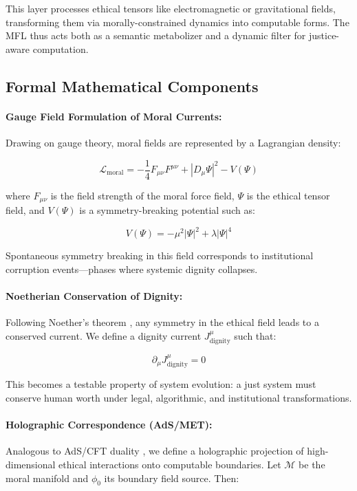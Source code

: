 \documentclass[12]{amsart}
\theoremstyle{plain}
\begin{document}
This layer processes ethical tensors like electromagnetic or gravitational fields, transforming them via morally-constrained dynamics into computable forms. The MFL thus acts both as a semantic metabolizer and a dynamic filter for justice-aware computation.

\subsection{Formal Mathematical Components}

\paragraph{Gauge Field Formulation of Moral Currents:}

Drawing on gauge theory, moral fields are represented by a Lagrangian density:

\[
\mathcal{L}_{\text{moral}} = -\frac{1}{4}F_{\mu\nu}F^{\mu\nu} + |D_\mu\Psi|^2 - V(\Psi)
\]

where \(F_{\mu\nu}\) is the field strength of the moral force field, \(\Psi\) is the ethical tensor field, and \(V(\Psi)\) is a symmetry-breaking potential such as:

\[
V(\Psi) = -\mu^2|\Psi|^2 + \lambda|\Psi|^4
\]

Spontaneous symmetry breaking in this field corresponds to institutional corruption events—phases where systemic dignity collapses.

\paragraph{Noetherian Conservation of Dignity:}

Following Noether’s theorem \citep{Noether1918}, any symmetry in the ethical field leads to a conserved current. We define a dignity current \(J^\mu_{\text{dignity}}\) such that:

\[
\partial_\mu J^\mu_{\text{dignity}} = 0
\]

This becomes a testable property of system evolution: a just system must conserve human worth under legal, algorithmic, and institutional transformations.

\paragraph{Holographic Correspondence (AdS/MET):}

Analogous to AdS/CFT duality \citep{Maldacena1998}, we define a holographic projection of high-dimensional ethical interactions onto computable boundaries. Let \(\mathcal{M}\) be the moral manifold and \(\phi_0\) its boundary field source. Then:
\end{document}

